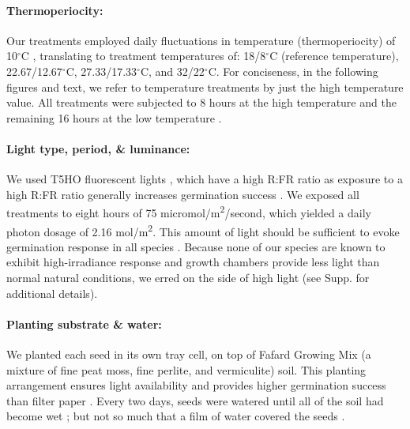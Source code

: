 \documentclass[11pt]{article}\usepackage[]{graphicx}\usepackage[]{color}
\begin{document}
	\paragraph{Thermoperiocity:} Our treatments employed daily fluctuations in temperature (thermoperiocity) of 10$^\circ$C \parencite[see e.g.,][]{Steinbauer1957, Toole1963,ISTA1954}, translating to treatment temperatures of: 18/8$^\circ$C (reference temperature), 22.67/12.67$^\circ$C, 27.33/17.33$^\circ$C, and 32/22$^\circ$C. For conciseness, in the following figures and text, we refer to temperature treatments by just the high temperature value. All treatments were subjected to 8 hours at the high temperature and the remaining 16 hours at the low temperature \parencite{Baskin1998,Roberts1981,Popay1970,Probert2000}. %

	\paragraph{Light type, period, \& luminance:} We used T5HO fluorescent lights \parencite{Toole1963}, which have a high R:FR ratio as exposure to a high R:FR ratio generally increases germination success \parencite[though some studies find germination requires high R:FR ratio or is insensitive,][]{Popay1970,Pons2000,Wulff1994}. %
We exposed all treatments to eight hours \parencite[coinciding with the higher temperature,][]{Baskin1998} of 75 micromol/m\textsuperscript{2}/second, which yielded a daily photon dosage of 2.16 mol/m\textsuperscript{2}. This amount of light should be sufficient to evoke germination response in all species \parencite{Pons1991}. Because none of our species are known to exhibit high-irradiance response and  growth chambers provide less light than normal natural conditions, we erred on the side of high light (see Supp. for additional details). 
	
	\paragraph{Planting substrate \& water:} We planted each seed in its own tray cell, on top of Fafard Growing Mix (a mixture of fine peat moss, fine perlite, and vermiculite) soil. This planting arrangement ensures light availability \parencite{Tester1987} and provides higher germination success than filter paper \parencite{Andrews1974}. Every two days, seeds were watered until all of the soil had become wet \parencite{Steinbauer1957}; but not so much that a film of water covered the seeds \parencite{AOSA1960}.
	
\end{document}
